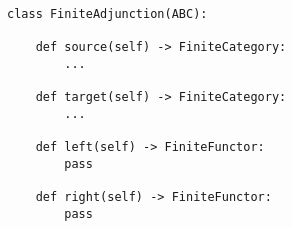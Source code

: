 \begin{verbatim}
class FiniteAdjunction(ABC):

    def source(self) -> FiniteCategory:
        ...

    def target(self) -> FiniteCategory:
        ...

    def left(self) -> FiniteFunctor:
        pass

    def right(self) -> FiniteFunctor:
        pass
\end{verbatim}